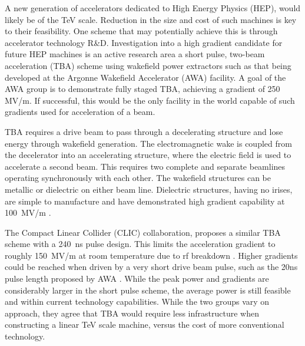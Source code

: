  \label{sec:motivation}


A new generation of accelerators dedicated to High Energy Physics
(HEP), would likely be of the TeV scale. Reduction in the size and cost
of such machines is key to their feasibility. One scheme that may potentially achieve this is 
through accelerator technology R\&D. Investigation into a 
high gradient candidate for future HEP machines is an active research area a
short pulse, two-beam acceleration (TBA) scheme using 
wakefield power extractors such as that being developed at the Argonne Wakefield Accelerator (AWA) facility. 
A goal of the AWA group is to demonstrate fully staged TBA, 
achieving a gradient of 250 MV/m. If successful, this would
be the only facility in the world capable of such gradients used for
acceleration of a beam.

TBA requires a drive beam to pass through a decelerating structure and
lose energy through wakefield generation. The electromagnetic wake
is coupled from the decelerator into an accelerating structure, where
the electric field is used to accelerate a second beam. 
This requires two complete and separate beamlines 
operating synchronously with each other.  
The wakefield structures can be metallic or dielectric on either beam line. 
Dielectric structures, having no irises, are simple to manufacture and have demonstrated
high gradient capability at \SI{100}{MV/m} \cite{WeiPaper}. 

The Compact Linear Collider (CLIC) collaboration, proposes a similar TBA scheme with
a \SI{240}{ns} pulse design. This limits the acceleration gradient
to roughly \SI{150}{MV/m} at room temperature due to rf breakdown \cite{CLICdesignReport}.
Higher gradients could be reached when driven by a very short drive
beam pulse, such as the 20ns pulse length proposed by AWA \cite{WeiPaper}. 
While the peak power and gradients are considerably larger in the short pulse scheme, 
the average power is still feasible and within current technology capabilities.
While the two groups vary on approach, they agree that TBA would 
require less infrastructure when constructing a linear TeV scale machine, 
versus the cost of more conventional technology. 

